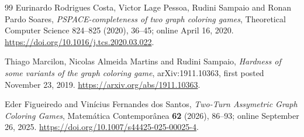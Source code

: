 \documentclass[11pt]{article}
\begin{document}
\begin{thebibliography}{99}
Eurinardo Rodrigues Costa, Victor Lage Pessoa, Rudini Sampaio and Ronan Pardo Soares,
\emph{PSPACE-completeness of two graph coloring games},
Theoretical Computer Science 824--825 (2020), 36--45; online April 16, 2020.
\url{https://doi.org/10.1016/j.tcs.2020.03.022}.

Thiago Marcilon, Nicolas Almeida Martins and Rudini Sampaio,
\emph{Hardness of some variants of the graph coloring game},
arXiv:1911.10363, first posted November 23, 2019.
\url{https://arxiv.org/abs/1911.10363}.

Eder Figueiredo and Vin\'icius Fernandes dos Santos,
\emph{Two-Turn Assymetric Graph Coloring Games},
Matem\'atica Contempor\^anea \textbf{62} (2026), 86--93; online September 26, 2025.
\url{https://doi.org/10.1007/s44425-025-00025-4}.

\end{thebibliography}
\end{document}
